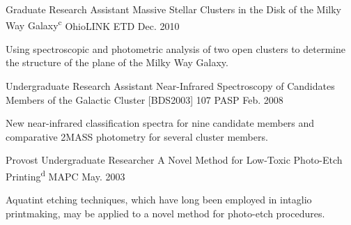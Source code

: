 \begin{cventries}
  \cvpublication
    {Graduate Research Assistant} %
    {Massive Stellar Clusters in the Disk of the Milky Way Galaxy\textsuperscript{c}} %
    {OhioLINK ETD} %
    {Dec. 2010} %
    {
      \begin{cvcompactparagraph}
        Using spectroscopic and photometric analysis of two open clusters to determine the structure of the plane of the Milky Way Galaxy.
      \end{cvcompactparagraph}
    }

  \cvpublication
    {Undergraduate Research Assistant} %
    {Near-Infrared Spectroscopy of Candidates Members of the Galactic Cluster [BDS2003] 107} %
    {PASP} %
    {Feb. 2008} %
    {
      \begin{cvcompactparagraph}
        New near-infrared classification spectra for nine candidate members and comparative 2MASS photometry for several cluster members.
      \end{cvcompactparagraph}
    }

  \cvpublication
    {Provost Undergraduate Researcher} %
    {A Novel Method for Low-Toxic Photo-Etch Printing\textsuperscript{d}} %
    {MAPC} %
    {May. 2003} %
    {
      \begin{cvcompactparagraph}
        Aquatint etching techniques, which have long been employed in intaglio printmaking, may be applied to a novel method for photo-etch procedures.
      \end{cvcompactparagraph}
    }

\end{cventries}
